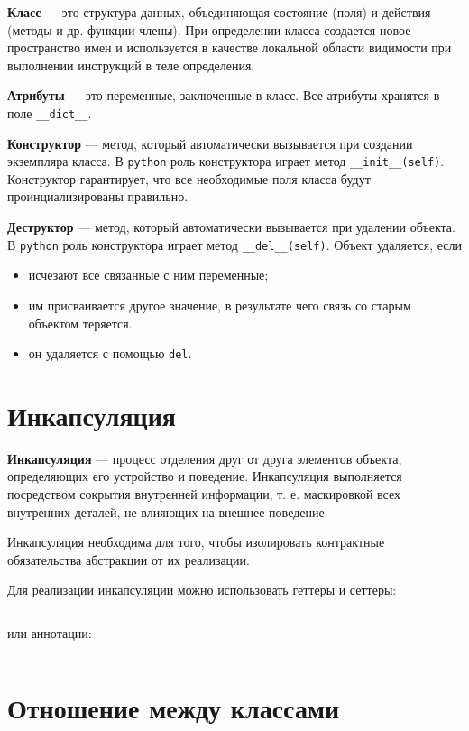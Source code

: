 \documentclass[a4paper,12pt,oneside]{extbook}
\begin{document}
\textbf{Класс} — это структура данных, объединяющая состояние (поля) и действия (методы и др. функции-члены). При определении класса создается новое пространство имен и используется в качестве локальной области видимости при выполнении инструкций в теле определения.

\textbf{Атрибуты} — это переменные, заключенные в класс. Все атрибуты хранятся в поле \texttt{\_\_dict\_\_}.

\textbf{Конструктор} — метод, который автоматически вызывается при создании экземпляра класса. В \texttt{python} роль конструктора играет метод \texttt{\_\_init\_\_(self)}. Конструктор гарантирует, что все необходимые поля класса будут проинциализированы правильно.

\textbf{Деструктор} — метод, который автоматически вызывается при удалении объекта. В \texttt{python} роль конструктора играет метод \texttt{\_\_del\_\_(self)}. Объект удаляется, если
\begin{itemize}
    \item исчезают все связанные с ним переменные;
    \item им присваивается другое значение, в результате чего связь со старым объектом теряется.
    \item он удаляется с помощью \texttt{del}.
\end{itemize}

\section{Инкапсуляция}%
\label{sec:Инкапсуляция}

\textbf{Инкапсуляция} — процесс отделения друг от друга элементов объекта, определяющих его устройство и поведение. Инкапсуляция выполняется посредством сокрытия внутренней информации, т. е. маскировкой всех внутренних деталей, не влияющих на внешнее поведение.

Инкапсуляция необходима для того, чтобы изолировать контрактные обязательства абстракции от их реализации.

Для реализации инкапсуляции можно использовать геттеры и сеттеры:
\inputminted{python}{./examples/get_and_set.py}
или аннотации:
\inputminted{python}{./examples/annotations.py}

\section{Отношение между классами}%
\label{sec:Отношение между классами}
\end{document}
